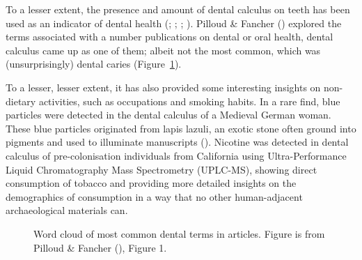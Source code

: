 \documentclass[
  b5paper,
]{book}
\begin{document}
To a lesser extent, the presence and amount of dental calculus on teeth
has been used as an indicator of dental health
(;
;
;
). Pilloud \& Fancher
() explored the terms
associated with a number publications on dental or oral health, dental
calculus came up as one of them; albeit not the most common, which was
(unsurprisingly) dental caries (Figure~\ref{fig-dental-terms}).

To a lesser, lesser extent, it has also provided some interesting
insights on non-dietary activities, such as occupations and smoking
habits. In a rare find, blue particles were detected in the dental
calculus of a Medieval German woman. These blue particles originated
from lapis lazuli, an exotic stone often ground into pigments and used
to illuminate manuscripts (). Nicotine was detected in dental calculus of
pre-colonisation individuals from California using Ultra-Performance
Liquid Chromatography Mass Spectrometry (UPLC-MS), showing direct
consumption of tobacco and providing more detailed insights on the
demographics of consumption in a way that no other human-adjacent
archaeological materials can.

\begin{figure}


\caption{\label{fig-dental-terms}Word cloud of most common dental terms
in articles. Figure is from Pilloud \& Fancher
(), Figure 1.}

\end{figure}%
\end{document}
